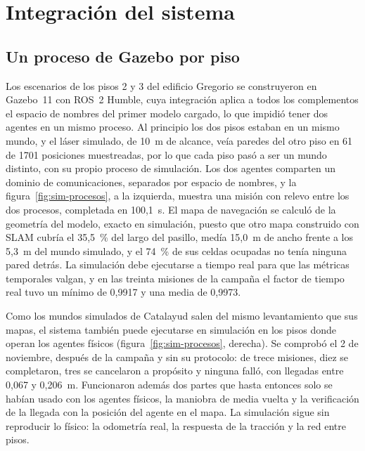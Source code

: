 \section{Integración del sistema}
\label{sec:integracion}

\subsection{Un proceso de Gazebo por piso}
\label{sec:simulacion}

Los escenarios de los pisos 2 y 3 del edificio Gregorio se construyeron en Gazebo~11 con ROS~2 Humble, cuya integración aplica a todos los complementos el espacio de nombres del primer modelo cargado, lo que impidió tener dos agentes en un mismo proceso. Al principio los dos pisos estaban en un mismo mundo, y el láser simulado, de 10~m de alcance, veía paredes del otro piso en 61 de 1701 posiciones muestreadas, por lo que cada piso pasó a ser un mundo distinto, con su propio proceso de simulación. Los dos agentes comparten un dominio de comunicaciones, separados por espacio de nombres, y la figura~\ref{fig:sim-procesos}, a la izquierda, muestra una misión con relevo entre los dos procesos, completada en 100,1~s. El mapa de navegación se calculó de la geometría del modelo, exacto en simulación, puesto que otro mapa construido con SLAM cubría el 35,5~\% del largo del pasillo, medía 15,0~m de ancho frente a los 5,3~m del mundo simulado, y el 74~\% de sus celdas ocupadas no tenía ninguna pared detrás. La simulación debe ejecutarse a tiempo real para que las métricas temporales valgan, y en las treinta misiones de la campaña el factor de tiempo real tuvo un mínimo de 0,9917 y una media de 0,9973.

Como los mundos simulados de Catalayud salen del mismo levantamiento que sus mapas, el sistema también puede ejecutarse en simulación en los pisos donde operan los agentes físicos (figura~\ref{fig:sim-procesos}, derecha). Se comprobó el 2 de noviembre, después de la campaña y sin su protocolo: de trece misiones, diez se completaron, tres se cancelaron a propósito y ninguna falló, con llegadas entre 0,067 y 0,206~m. Funcionaron además dos partes que hasta entonces solo se habían usado con los agentes físicos, la maniobra de media vuelta y la verificación de la llegada con la posición del agente en el mapa. La simulación sigue sin reproducir lo físico: la odometría real, la respuesta de la tracción y la red entre pisos.

